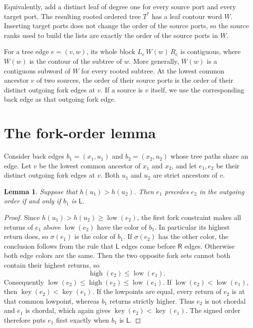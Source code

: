 \documentclass[11pt]{article}
\newcommand{\lemmaname}{}
\newtheorem*{namedlemma}{Lemma \lemmaname}
\newenvironment{lem}[1]{\renewcommand{\lemmaname}{#1}\begin{namedlemma}}{\end{namedlemma}}
\DeclareMathOperator{\low}{low}
\DeclareMathOperator{\high}{high}
\DeclareMathOperator{\key}{key}
\newcommand{\cL}{\mathsf{L}}
\newcommand{\cR}{\mathsf{R}}
\begin{document}
Equivalently, add a distinct leaf of degree one for every source port and every
target port. The resulting rooted ordered tree $T^*$ has a leaf contour word
$W$. Inserting target ports does not change the order of the source ports, so
the source ranks used to build the lists are exactly the order of the source
ports in $W$.

For a tree edge $e=(v,w)$, its whole block $L_e\,W(w)\,R_e$ is contiguous,
where $W(w)$ is the contour of the subtree of $w$. More generally, $W(w)$ is a
contiguous subword of $W$ for every rooted subtree. At the lowest common
ancestor $v$ of two sources, the order of their source ports is the order of
their distinct outgoing fork edges at $v$. If a source is $v$ itself, we use
the corresponding back edge as that outgoing fork edge.

\section{The fork-order lemma}

Consider back edges $b_1=(x_1,u_1)$ and $b_2=(x_2,u_2)$ whose tree paths share
an edge. Let $v$ be the lowest common ancestor of $x_1$ and $x_2$, and let
$e_1,e_2$ be their distinct outgoing fork edges at $v$. Both $u_1$ and $u_2$
are strict ancestors of $v$.

\begin{lem}{(A)}
Suppose that $h(u_1)>h(u_2)$. Then $e_1$ precedes $e_2$ in the outgoing order
if and only if $b_1$ is $\cL$.
\end{lem}

\begin{proof}
Since $h(u_1)>h(u_2)\ge\low(e_2)$, the first fork constraint makes all returns
of $e_1$ above $\low(e_2)$ have the color of $b_1$. In particular its highest
return does, so $\sigma(e_1)$ is the color of $b_1$. If $\sigma(e_2)$ has the
other color, the conclusion follows from the rule that $\cL$ edges come before
$\cR$ edges. Otherwise both edge colors are the same. Then the two opposite
fork sets cannot both contain their highest returns, so
\begin{equation*}
\high(e_2)\le\low(e_1).
\end{equation*}
Consequently $\low(e_2)\le\high(e_2)\le\low(e_1)$. If
$\low(e_2)<\low(e_1)$, then $\key(e_2)<\key(e_1)$. If the lowpoints are equal,
every return of $e_2$ is at that common lowpoint, whereas $b_1$ returns
strictly higher. Thus $e_2$ is not chordal and $e_1$ is chordal, which again
gives $\key(e_2)<\key(e_1)$. The signed order therefore puts $e_1$ first
exactly when $b_1$ is $\cL$.
\end{proof}
\end{document}
